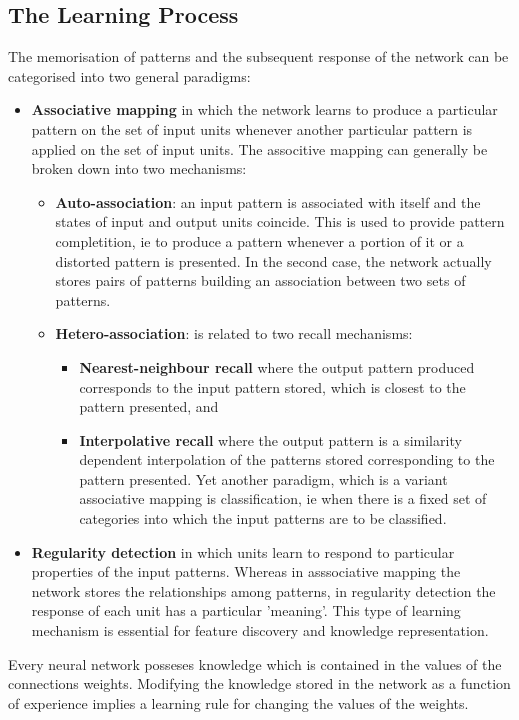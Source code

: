 \documentclass[12pt,times,a4paper]{report}
\begin{document}
{{\begin{normalsize}
\section{The Learning Process}
The memorisation of patterns and the subsequent response of the network can be categorised into
two general paradigms:
\begin{itemize}
\item \textbf{Associative mapping} in which the network learns to produce a particular pattern on the set of
input units whenever another particular pattern is applied on the set of input units. The associtive
mapping can generally be broken down into two mechanisms: 
\begin{itemize}
\item \textbf{Auto-association}: an input pattern is associated with itself and the states of input and output
units coincide. This is used to provide pattern completition, ie to produce a pattern whenever a
portion of it or a distorted pattern is presented. In the second case, the network actually stores
pairs of patterns building an association between two sets of patterns. 
\item \textbf{Hetero-association}: is related to two recall mechanisms:
\begin{itemize}
\item \textbf{Nearest-neighbour recall} where the output pattern produced corresponds to the input pattern
stored, which is closest to the pattern presented, and 
\item \textbf{Interpolative recall} where the output pattern is a similarity dependent interpolation of the
patterns stored corresponding to the pattern presented. Yet another paradigm, which is a variant
associative mapping is classification, ie when there is a fixed set of categories into which the
input patterns are to be classified. 
\end{itemize}
\end{itemize}
\item \textbf{Regularity detection} in which units learn to respond to particular properties of the input
patterns. Whereas in asssociative mapping the network stores the relationships among patterns,
in regularity detection the response of each unit has a particular 'meaning'. This type of learning
mechanism is essential for feature discovery and knowledge representation. 
\end{itemize}
Every neural network posseses knowledge which is contained in the values of the connections
weights. Modifying the knowledge stored in the network as a function of experience implies a
learning rule for changing the values of the weights.
\newpage

\end{normalsize}}}
\end{document}
